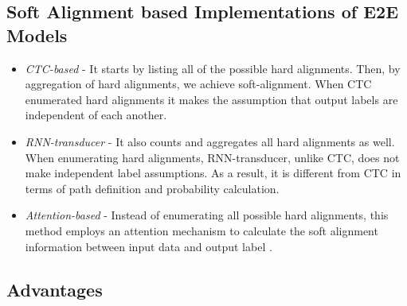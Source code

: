 \subsection{Soft Alignment based Implementations of E2E Models}
\begin{itemize}
    \item \textit{CTC-based} - It starts by listing all of the possible hard alignments. Then, by aggregation of hard alignments, we achieve soft-alignment. When CTC enumerated hard alignments it makes the assumption that output labels are independent of each another.
    \item \textit{RNN-transducer} - It also counts and aggregates all hard alignments as well. When enumerating hard alignments, RNN-transducer, unlike CTC, does not make independent label assumptions. As a result, it is different from CTC in terms of path definition and probability calculation.
    \item \textit{Attention-based} - Instead of enumerating all possible hard alignments, this method employs an attention mechanism to calculate the soft alignment information between input data and output label \cite{backstrom_introduction_2022}.
    
\end{itemize}

\subsection{Advantages}
\label{sub:E2E-advantages}

